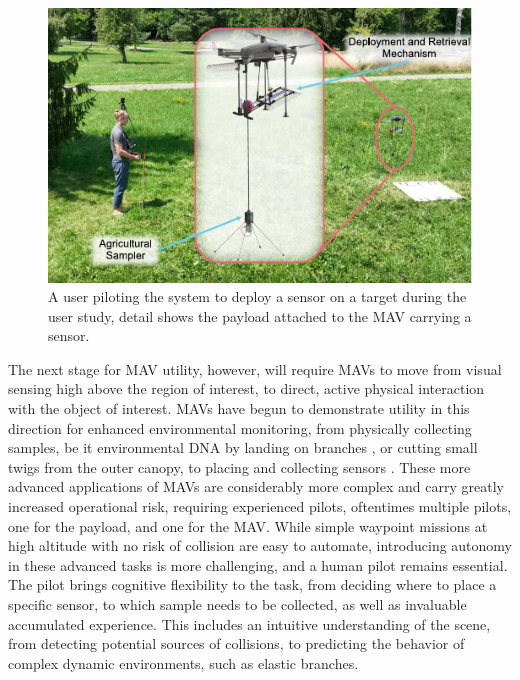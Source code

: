 \begin{figure}[!t]
\centering
\includegraphics[width=1\columnwidth]{chapters/papers/UR/figures/fig-1-summary/fig-1-summary.pdf}
\caption{A user piloting the system to deploy a sensor on a target during the user study, detail shows the payload attached to the \gls{MAV} carrying a sensor.}
\label{fig:fig1-summary}
\figurevspacebelow
\end{figure}

The next stage for \gls{MAV} utility, however, will require \glspl{MAV} to move from visual sensing high above the region of interest, to direct, active physical interaction with the object of interest. \glspl{MAV} have begun to demonstrate utility in this direction for enhanced environmental monitoring, from physically collecting samples, be it environmental DNA by landing on branches \cite{Aucone2023a}, or cutting small twigs from the outer canopy\cite{Charron2020}, to placing and collecting sensors \cite{Geckeler2023a, Hamaza}. These more advanced applications of \glspl{MAV} are considerably more complex and carry greatly increased operational risk, requiring experienced pilots, oftentimes multiple pilots, one for the payload, and one for the MAV. While simple waypoint missions at high altitude with no risk of collision are easy to automate, introducing autonomy in these advanced tasks is more challenging, and a human pilot remains essential. The pilot brings cognitive flexibility to the task, from deciding where to place a specific sensor, to which sample needs to be collected, as well as invaluable accumulated experience. 
This includes an intuitive understanding of the scene, from detecting potential sources of collisions, to predicting the behavior of complex dynamic environments, such as elastic branches. 

